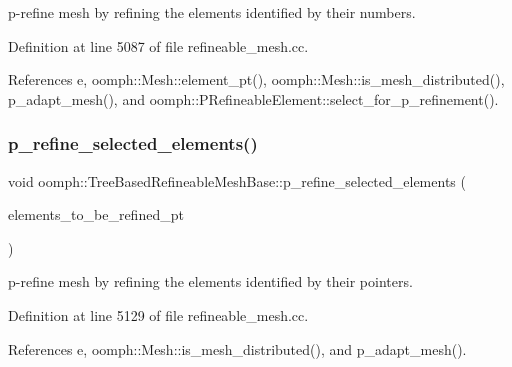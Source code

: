 p-\/refine mesh by refining the elements identified by their numbers. 



Definition at line 5087 of file refineable\+\_\+mesh.\+cc.



References e, oomph\+::\+Mesh\+::element\+\_\+pt(), oomph\+::\+Mesh\+::is\+\_\+mesh\+\_\+distributed(), p\+\_\+adapt\+\_\+mesh(), and oomph\+::\+P\+Refineable\+Element\+::select\+\_\+for\+\_\+p\+\_\+refinement().

\mbox{\label{classoomph_1_1TreeBasedRefineableMeshBase_acfd7cb800e040fab51de2233104405c4}} 
\subsubsection{\texorpdfstring{p\+\_\+refine\+\_\+selected\+\_\+elements()}{p\_refine\_selected\_elements()}\hspace{0.1cm}{\footnotesize\ttfamily [2/2]}}
{\footnotesize\ttfamily void oomph\+::\+Tree\+Based\+Refineable\+Mesh\+Base\+::p\+\_\+refine\+\_\+selected\+\_\+elements (\begin{DoxyParamCaption}\item[{const \hyperlink{classoomph_1_1Vector}{Vector}$<$ \hyperlink{classoomph_1_1PRefineableElement}{P\+Refineable\+Element} $\ast$$>$ \&}]{elements\+\_\+to\+\_\+be\+\_\+refined\+\_\+pt }\end{DoxyParamCaption})}



p-\/refine mesh by refining the elements identified by their pointers. 



Definition at line 5129 of file refineable\+\_\+mesh.\+cc.



References e, oomph\+::\+Mesh\+::is\+\_\+mesh\+\_\+distributed(), and p\+\_\+adapt\+\_\+mesh().

\mbox{\label{classoomph_1_1TreeBasedRefineableMeshBase_a270d74e0e30f9956c85e4cdcc202c98b}} 
